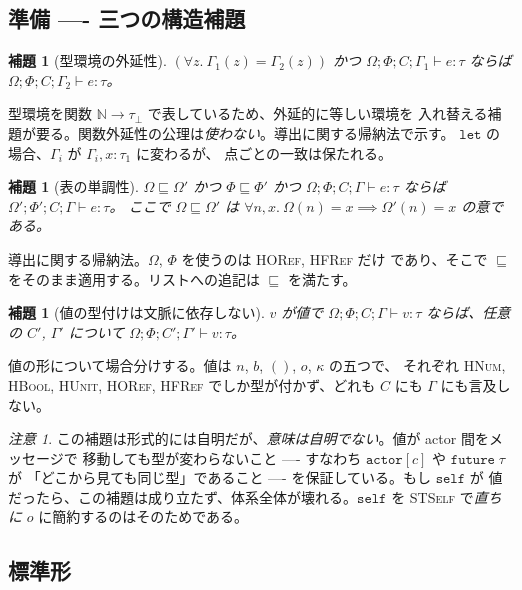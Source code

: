 \documentclass[11pt,a4paper]{ltjsarticle}
\newtheorem{lemma}[theorem]{補題}
\theoremstyle{definition}
\theoremstyle{remark}
\newtheorem{remark}[theorem]{注意}
\newcommand{\tact}[1]{\mathtt{actor}[#1]}
\newcommand{\tfut}[1]{\mathtt{future}\;#1}
\newcommand{\Om}{\Omega}          %
\newcommand{\Ph}{\Phi}            %
\newcommand{\jt}[3]{\Om;\Ph;#1;#2 \vdash #3}
\begin{document}
\subsection{準備 ---- 三つの構造補題}

\begin{lemma}[型環境の外延性]
\label{lem:envext}
$(\forall z.\ \Gamma_1(z) = \Gamma_2(z))$ かつ $\jt{C}{\Gamma_1}{e : \tau}$ ならば
$\jt{C}{\Gamma_2}{e : \tau}$。
\end{lemma}

型環境を関数 $\mathbb{N} \to \tau_\bot$ で表しているため、外延的に等しい環境を
入れ替える補題が要る。関数外延性の公理は\emph{使わない}。導出に関する帰納法で示す。
$\mathtt{let}$ の場合、$\Gamma_i$ が $\Gamma_i, x{:}\tau_1$ に変わるが、
点ごとの一致は保たれる。

\begin{lemma}[表の単調性]
\label{lem:mono}
$\Om \sqsubseteq \Om'$ かつ $\Ph \sqsubseteq \Ph'$ かつ
$\Om;\Ph;C;\Gamma \vdash e : \tau$ ならば
$\Om';\Ph';C;\Gamma \vdash e : \tau$。
ここで $\Om \sqsubseteq \Om'$ は
$\forall n, x.\ \Om(n) = x \implies \Om'(n) = x$ の意である。
\end{lemma}

導出に関する帰納法。$\Om$, $\Ph$ を使うのは \textsc{HORef}, \textsc{HFRef} だけ
であり、そこで $\sqsubseteq$ をそのまま適用する。リストへの追記は
$\sqsubseteq$ を満たす。

\begin{lemma}[値の型付けは文脈に依存しない]
\label{lem:vindep}
$v$ が値で $\jt{C}{\Gamma}{v : \tau}$ ならば、任意の $C'$, $\Gamma'$ について
$\Om;\Ph;C';\Gamma' \vdash v : \tau$。
\end{lemma}

値の形について場合分けする。値は $n$, $b$, $()$, $o$, $\kappa$ の五つで、
それぞれ \textsc{HNum}, \textsc{HBool}, \textsc{HUnit}, \textsc{HORef},
\textsc{HFRef} でしか型が付かず、どれも $C$ にも $\Gamma$ にも言及しない。

\begin{remark}
この補題は形式的には自明だが、\emph{意味は自明でない}。値が actor 間をメッセージで
移動しても型が変わらないこと ---- すなわち $\tact{c}$ や $\tfut{\tau}$ が
「どこから見ても同じ型」であること ---- を保証している。もし $\mathtt{self}$ が
値だったら、この補題は成り立たず、体系全体が壊れる。$\mathtt{self}$ を
\textsc{STSelf} で\emph{直ちに} $o$ に簡約するのはそのためである。
\end{remark}

\subsection{標準形}
\end{document}

